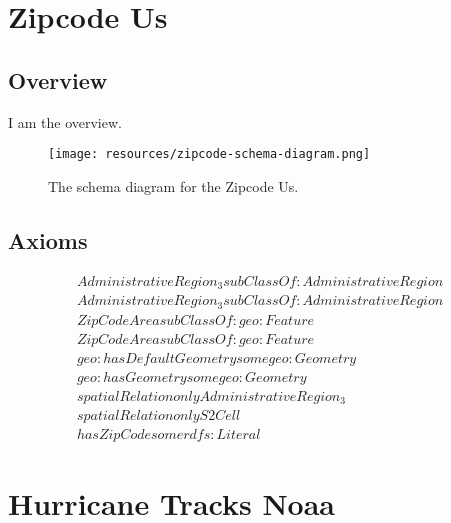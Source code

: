 
\section{Zipcode Us}
\label{sec:zipcode-us}
\subsection{Overview}
\label{ssec:overview}

I am the overview.

\begin{figure}[h!]
  \begin{center}
    \texttt{[image: resources/zipcode-schema-diagram.png]}
  \end{center}
  \caption{The schema diagram for the Zipcode Us.}
  \label{fig:ov-diagram}
\end{figure}


\subsection{Axioms}
\begin{align}
  AdministrativeRegion_3 subClassOf: AdministrativeRegion\\
  AdministrativeRegion_3 subClassOf: AdministrativeRegion\\
  ZipCodeArea subClassOf: geo:Feature\\
  ZipCodeArea subClassOf: geo:Feature\\
  geo:hasDefaultGeometry some geo:Geometry \\
  geo:hasGeometry some geo:Geometry \\
  spatialRelation only AdministrativeRegion_3 \\
  spatialRelation only S2Cell \\
  hasZipCode some rdfs:Literal \end{align}



\section{Hurricane Tracks Noaa}
\label{sec:hurricane-tracks-noaa}
